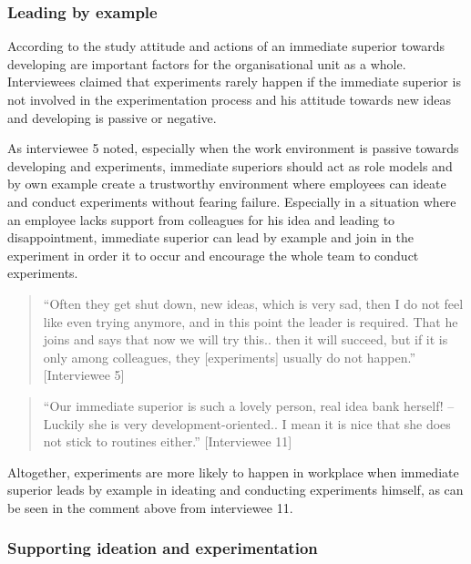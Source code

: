 \subsubsection{Leading by example}

According to the study attitude and actions of an immediate superior towards developing are important factors for the organisational unit as a whole. Interviewees claimed that experiments rarely happen if the immediate superior is not involved in the experimentation process and his attitude towards new ideas and developing is passive or negative. 

As interviewee 5 noted, especially when the work environment is passive towards developing and experiments, immediate superiors should act as role models and by own example create a trustworthy environment where employees can ideate and conduct experiments without fearing failure. Especially in a situation where an employee lacks support from colleagues for his idea and leading to disappointment, immediate superior can lead by example and join in the experiment in order it to occur and encourage the whole team to conduct experiments.
   
\begin{quote}
``Often they get shut down, new ideas, which is very sad, then I do not feel like even trying anymore, and in this point the leader is required. That he joins and says that now we will try this.. then it will succeed, but if it is only among colleagues, they [experiments] usually do not happen.'' [Interviewee 5]
\end{quote}
\begin{quote}
 ``Our immediate superior is such a lovely person, real idea bank herself! -- Luckily she is very development-oriented.. I mean it is nice that she does not stick to routines either.'' [Interviewee 11]
\end{quote}
Altogether, experiments are more likely to happen in workplace when immediate superior leads by example in ideating and conducting experiments himself, as can be seen in the comment above from interviewee 11.

\subsubsection{Supporting ideation and experimentation}

